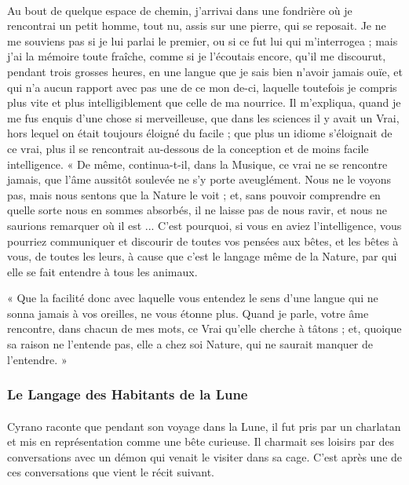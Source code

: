 \documentclass[a4paper, 11pt, oneside, landscape]{article}
\begin{document}
\paragraph{}
Au bout de quelque espace de chemin, j'arrivai dans une fondrière où je rencontrai un petit homme, tout nu, assis sur une pierre, qui se reposait. Je ne me souviens pas si je lui parlai le premier, ou si ce fut lui qui m'interrogea ; mais j'ai la mémoire toute fraîche, comme si je l'écoutais encore, qu'il me discourut, pendant trois grosses heures, en une langue que je sais bien n'avoir jamais ouïe, et qui n'a aucun rapport avec pas une de ce mon de-ci, laquelle toutefois je compris plus vite et plus intelligiblement que celle de ma nourrice. Il m'expliqua, quand je me fus enquis d'une chose si merveilleuse, que dans les sciences il y avait un Vrai, hors lequel on était toujours éloigné du facile ; que plus un idiome s'éloignait de ce vrai, plus il se rencontrait au-dessous de la conception et de moins facile intelligence. « De même, continua-t-il, dans la Musique, ce vrai ne se rencontre jamais, que l'âme aussitôt soulevée ne s'y porte aveuglément. Nous ne le voyons pas, mais nous sentons que la Nature le voit ; et, sans pouvoir comprendre en quelle sorte nous en sommes absorbés, il ne laisse pas de nous ravir, et nous ne saurions remarquer où il est ... C'est pourquoi, si vous en aviez l'intelligence, vous pourriez communiquer et discourir de toutes vos pensées aux bêtes, et les bêtes à vous, de toutes les leurs, à cause que c'est le langage même de la Nature, par qui elle se fait entendre à tous les animaux.

« Que la facilité donc avec laquelle vous entendez le sens d'une langue qui ne sonna jamais à vos oreilles, ne vous étonne plus. Quand je parle, votre âme rencontre, dans chacun de mes mots, ce Vrai qu'elle cherche à tâtons ; et, quoique sa raison ne l'entende pas, elle a chez soi Nature, qui ne saurait manquer de l'entendre. »

\subsubsection{Le Langage des Habitants de la Lune}
\paragraph{}
Cyrano raconte que pendant son voyage dans la Lune, il fut pris par un charlatan et mis en représentation comme une bête curieuse. Il charmait ses loisirs par des conversations avec un démon qui venait le visiter dans sa cage. C'est après une de ces conversations que vient le récit suivant.
\end{document}

